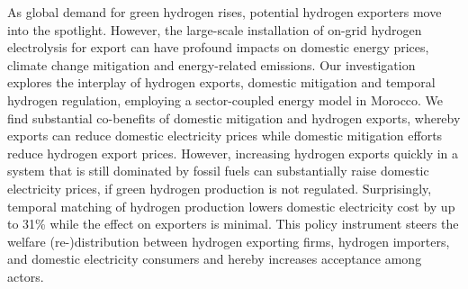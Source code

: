 




As global demand for green hydrogen rises, potential hydrogen exporters move into the spotlight.
However, the large-scale installation of on-grid hydrogen electrolysis for export can have profound impacts on domestic energy prices, climate change mitigation and energy-related emissions.
Our investigation explores the interplay of hydrogen exports, domestic mitigation and temporal hydrogen regulation, employing a sector-coupled energy model in Morocco. 
We find substantial co-benefits of domestic mitigation and hydrogen exports, whereby exports can reduce domestic electricity prices while domestic mitigation efforts reduce hydrogen export prices.
However, increasing hydrogen exports quickly in a system that is still dominated by fossil fuels can substantially raise domestic electricity prices, if green hydrogen production is not regulated.
Surprisingly, temporal matching of hydrogen production lowers domestic electricity cost by up to 31\% while the effect on exporters is minimal. 
This policy instrument steers the welfare (re-)distribution between hydrogen exporting firms, hydrogen importers, and domestic electricity consumers and hereby increases acceptance among actors.

